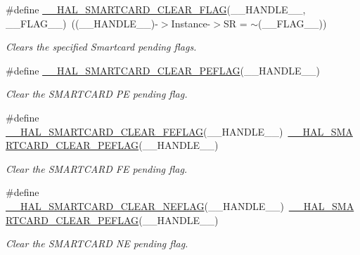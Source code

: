 \begin{DoxyCompactItemize}
\#define \hyperlink{group___s_m_a_r_t_c_a_r_d___exported___macros_gab40a9ea5252be0340f074b1cab9c2264}{\+\_\+\+\_\+\+H\+A\+L\+\_\+\+S\+M\+A\+R\+T\+C\+A\+R\+D\+\_\+\+C\+L\+E\+A\+R\+\_\+\+F\+L\+AG}(\+\_\+\+\_\+\+H\+A\+N\+D\+L\+E\+\_\+\+\_\+,  \+\_\+\+\_\+\+F\+L\+A\+G\+\_\+\+\_\+)~((\+\_\+\+\_\+\+H\+A\+N\+D\+L\+E\+\_\+\+\_\+)-\/$>$Instance-\/$>$SR = $\sim$(\+\_\+\+\_\+\+F\+L\+A\+G\+\_\+\+\_\+))
\begin{DoxyCompactList}\small\item\em Clears the specified Smartcard pending flags. \end{DoxyCompactList}\item 
\#define \hyperlink{group___s_m_a_r_t_c_a_r_d___exported___macros_gae74183878abc11bff63af74fc3ffa3a3}{\+\_\+\+\_\+\+H\+A\+L\+\_\+\+S\+M\+A\+R\+T\+C\+A\+R\+D\+\_\+\+C\+L\+E\+A\+R\+\_\+\+P\+E\+F\+L\+AG}(\+\_\+\+\_\+\+H\+A\+N\+D\+L\+E\+\_\+\+\_\+)
\begin{DoxyCompactList}\small\item\em Clear the S\+M\+A\+R\+T\+C\+A\+RD PE pending flag. \end{DoxyCompactList}\item 
\#define \hyperlink{group___s_m_a_r_t_c_a_r_d___exported___macros_gac6c4cf3895f565304c68faf23139a533}{\+\_\+\+\_\+\+H\+A\+L\+\_\+\+S\+M\+A\+R\+T\+C\+A\+R\+D\+\_\+\+C\+L\+E\+A\+R\+\_\+\+F\+E\+F\+L\+AG}(\+\_\+\+\_\+\+H\+A\+N\+D\+L\+E\+\_\+\+\_\+)~\hyperlink{group___s_m_a_r_t_c_a_r_d___exported___macros_gae74183878abc11bff63af74fc3ffa3a3}{\+\_\+\+\_\+\+H\+A\+L\+\_\+\+S\+M\+A\+R\+T\+C\+A\+R\+D\+\_\+\+C\+L\+E\+A\+R\+\_\+\+P\+E\+F\+L\+AG}(\+\_\+\+\_\+\+H\+A\+N\+D\+L\+E\+\_\+\+\_\+)
\begin{DoxyCompactList}\small\item\em Clear the S\+M\+A\+R\+T\+C\+A\+RD FE pending flag. \end{DoxyCompactList}\item 
\#define \hyperlink{group___s_m_a_r_t_c_a_r_d___exported___macros_gaa6e054a509676625edc0dfa060f1a742}{\+\_\+\+\_\+\+H\+A\+L\+\_\+\+S\+M\+A\+R\+T\+C\+A\+R\+D\+\_\+\+C\+L\+E\+A\+R\+\_\+\+N\+E\+F\+L\+AG}(\+\_\+\+\_\+\+H\+A\+N\+D\+L\+E\+\_\+\+\_\+)~\hyperlink{group___s_m_a_r_t_c_a_r_d___exported___macros_gae74183878abc11bff63af74fc3ffa3a3}{\+\_\+\+\_\+\+H\+A\+L\+\_\+\+S\+M\+A\+R\+T\+C\+A\+R\+D\+\_\+\+C\+L\+E\+A\+R\+\_\+\+P\+E\+F\+L\+AG}(\+\_\+\+\_\+\+H\+A\+N\+D\+L\+E\+\_\+\+\_\+)
\begin{DoxyCompactList}\small\item\em Clear the S\+M\+A\+R\+T\+C\+A\+RD NE pending flag. \end{DoxyCompactList}\item 

\end{DoxyCompactItemize}
